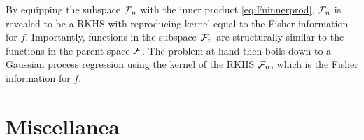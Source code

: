 \documentclass[a4paper,showframe,11pt]{report}
\begin{document}
By equipping the subspace ${\mathcal F}_n$ with the inner product \cref{eq:Fninnerprod}, ${\mathcal F}_n$ is revealed to be a RKHS with reproducing kernel equal to the Fisher information for $f$.
Importantly, functions in the subspace ${\mathcal F}_n$ are structurally similar to the functions in the parent space ${\mathcal F}$.
The problem at hand then boils down to a Gaussian process regression using the kernel of the RKHS ${\mathcal F}_n$, which is the Fisher information for $f$.

\section{Miscellanea}


\hClosingStuffStandalone
\end{document}
